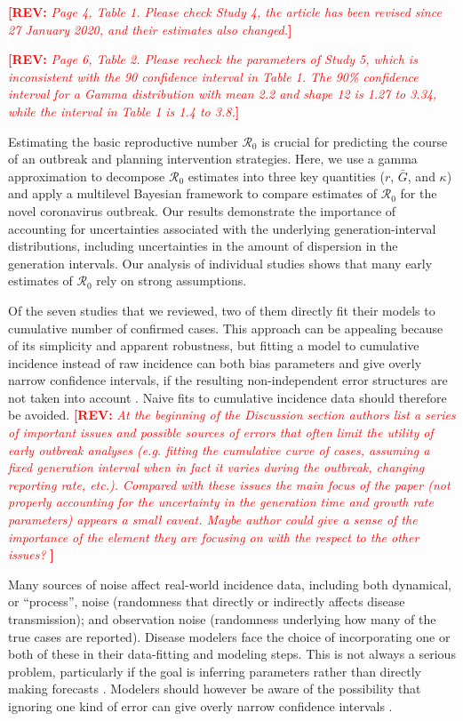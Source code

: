\documentclass[12pt]{article}
\newcommand{\Ro}{\ensuremath{{\mathcal R}_{0}}\xspace}
\newcommand{\comment}[3]{\textcolor{#1}{\textbf{[#2: }\textsl{#3}\textbf{]}}}
\newcommand{\rev}[1]{\comment{red}{REV}{#1}}
\begin{document}
\rev{Page 4, Table 1. Please check Study 4, the article has been revised since 27 January 2020,
and their estimates also changed.}

\rev{Page 6, Table 2. Please recheck the parameters of Study 5, which is inconsistent with the 90%
confidence interval in Table 1. The 90\% confidence interval for a Gamma distribution with mean
2.2 and shape 12 is 1.27 to 3.34, while the interval in Table 1 is 1.4 to 3.8.}

Estimating the basic reproductive number \Ro is crucial for predicting the course of an outbreak and planning intervention strategies.
Here, we use a gamma approximation \citep{park2019practical} to decompose \Ro estimates into three key quantities ($r$, $\bar G$, and $\kappa$) and apply a multilevel Bayesian framework to compare estimates of \Ro for the novel coronavirus outbreak.
Our results demonstrate the importance of accounting for uncertainties associated with the underlying generation-interval distributions, including uncertainties in the amount of dispersion in the generation intervals.
Our analysis of individual studies shows that many early estimates of \Ro rely on strong assumptions.

Of the seven studies that we reviewed, two of them directly fit their models to cumulative number of confirmed cases.
This approach can be appealing because of its simplicity and apparent robustness, but fitting a model to cumulative incidence instead of raw incidence can both bias parameters and give overly narrow confidence intervals, if the resulting non-independent error structures are not taken into account \citep{ma2014estimating, king2015avoidable}.
Naive fits to cumulative incidence data should therefore be avoided.
\rev{
At the beginning of the Discussion section authors list a series of important issues and possible sources of errors that often limit the utility of early outbreak analyses (e.g. fitting the cumulative curve of cases, assuming a fixed generation interval when in fact it varies during the outbreak, changing reporting rate, etc.). Compared with these issues the main focus of the paper (not properly accounting for the uncertainty in the generation time and growth rate parameters) appears a small caveat. Maybe author could give a sense of the importance of the element they are focusing on with the respect to the other issues?
}

Many sources of noise affect real-world incidence data, including both dynamical, or ``process'', noise (randomness that directly or indirectly affects disease transmission); and observation noise (randomness underlying how many of the true cases are reported).  
Disease modelers face the choice of incorporating one or both of these in their data-fitting and modeling steps. 
This is not always a serious problem, particularly if the goal is inferring parameters rather than directly making forecasts \citep{ma2014estimating}.
Modelers should however be aware of the possibility that ignoring one kind of error can give overly narrow confidence intervals \citep{king2015avoidable,taylor2016stochasticity}.
\end{document}
